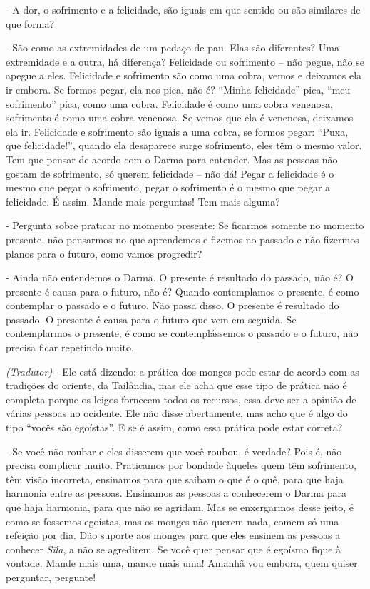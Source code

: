 - A dor, o sofrimento e a felicidade, são iguais em que sentido ou
são similares de que forma?

- São como as extremidades de um pedaço de pau. Elas são
diferentes? Uma extremidade e a outra, há diferença? Felicidade ou
sofrimento – não pegue, não se apegue a eles. Felicidade e sofrimento
são como uma cobra, vemos e deixamos ela ir embora. Se formos pegar,
ela nos pica, não é? “Minha felicidade” pica, “meu sofrimento” pica,
como uma cobra. Felicidade é como uma cobra venenosa, sofrimento é como
uma cobra venenosa. Se vemos que ela é venenosa, deixamos ela ir.
Felicidade e sofrimento são iguais a uma cobra, se formos pegar: “Puxa,
que felicidade!”, quando ela desaparece surge sofrimento, eles têm o
mesmo valor. Tem que pensar de acordo com o Darma para entender. Mas as
pessoas não gostam de sofrimento, só querem felicidade – não dá! Pegar
a felicidade é o mesmo que pegar o sofrimento, pegar o sofrimento é o
mesmo que pegar a felicidade. É assim. Mande mais perguntas! Tem mais
alguma?

- Pergunta sobre praticar no momento presente: Se ficarmos somente
no momento presente, não pensarmos no que aprendemos e fizemos no
passado e não fizermos planos para o futuro, como vamos progredir?

- Ainda não entendemos o Darma. O presente é resultado do passado,
não é? O presente é causa para o futuro, não é? Quando contemplamos o
presente, é como contemplar o passado e o futuro. Não passa disso. O
presente é resultado do passado. O presente é causa para o futuro que
vem em seguida. Se contemplarmos o presente, é como se contemplássemos
o passado e o futuro, não precisa ficar repetindo muito.

\textit{(Tradutor) }- Ele está dizendo: a prática dos monges pode
estar de acordo com as tradições do oriente, da Tailândia, mas ele acha
que esse tipo de prática não é completa porque os leigos fornecem todos
os recursos, essa deve ser a opinião de várias pessoas no ocidente. Ele
não disse abertamente, mas acho que é algo do tipo “vocês são
egoístas”. E se é assim, como essa prática pode estar correta?

- Se você não roubar e eles disserem que você roubou, é verdade?
Pois é, não precisa complicar muito. Praticamos por bondade àqueles
quem têm sofrimento, têm visão incorreta, ensinamos para que saibam o
que é o quê, para que haja harmonia entre as pessoas. Ensinamos as
pessoas a conhecerem o Darma para que haja harmonia, para que não se
agridam. Mas se enxergarmos desse jeito, é como se fossemos egoístas,
mas os monges não querem nada, comem só uma refeição por dia. Dão
suporte aos monges para que eles ensinem as pessoas a conhecer
\textit{Sīla}, a não se agredirem. Se você quer pensar que é egoísmo
fique à vontade. Mande mais uma, mande mais uma! Amanhã vou embora,
quem quiser perguntar, pergunte!


